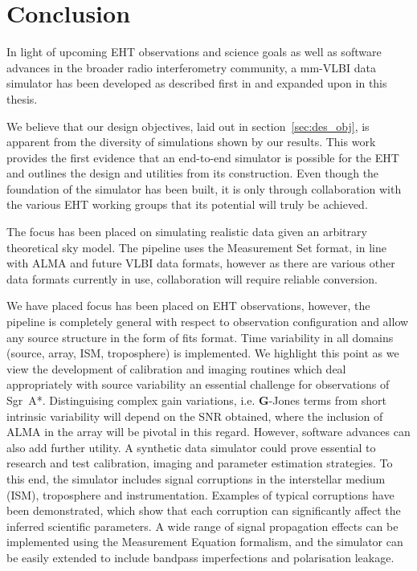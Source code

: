 \chapter{Conclusion} %

In light of upcoming EHT observations and science goals as well as software advances in the broader radio interferometry community, a mm-VLBI data simulator has been developed as described first in \citet{Blecher_2016} and  expanded upon in this thesis.

We believe that our design objectives, laid out in section~\ref{sec:des_obj}, is apparent from the diversity of simulations shown by our results. This work provides the first evidence that an end-to-end simulator is possible for the EHT and outlines the design and utilities from its construction. Even though the foundation of the simulator has been built, it is only through collaboration with the various EHT working groups that its potential will truly be achieved.


The focus has been placed on simulating realistic data given an arbitrary theoretical sky model. The pipeline uses the {\sc Measurement Set} format, in line with ALMA and future VLBI data formats, however as there are various other data formats currently in use, collaboration will require reliable conversion.


We have placed focus has been placed on EHT observations, however, the pipeline is completely general with respect to observation configuration and allow any source structure in the form of {\sc fits} format. 
Time variability in all domains (source, array, ISM, troposphere) is implemented. We highlight this point as we view the development of calibration and imaging routines which deal appropriately with source variability an essential challenge for observations of Sgr~A*. Distinguising complex gain variations, i.e. $\bm G$-Jones terms from short intrinsic variability will depend on the SNR obtained, where the inclusion of ALMA in the array will be pivotal in this regard. However, software advances can also add further utility. A synthetic data simulator could prove essential to research and test calibration, imaging and parameter estimation strategies.
To this end, the simulator includes signal corruptions in the interstellar medium (ISM), troposphere and instrumentation. Examples of typical corruptions have been demonstrated, which show that each corruption can significantly affect the inferred scientific parameters. A wide range of signal propagation effects can be implemented using the Measurement Equation formalism, and the simulator can be easily extended to include bandpass imperfections and polarisation leakage.


